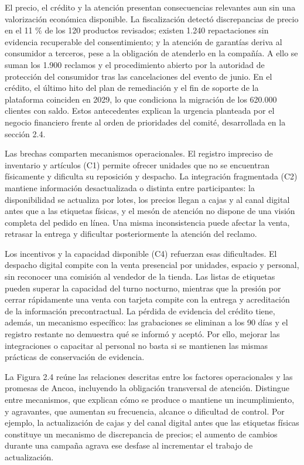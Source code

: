 \documentclass[11pt]{article}
\begin{document}
El precio, el crédito y la atención presentan consecuencias relevantes aun sin una valorización económica disponible. La fiscalización detectó discrepancias de precio en el 11 \% de los 120 productos revisados; existen 1.240 repactaciones sin evidencia recuperable del consentimiento; y la atención de garantías deriva al consumidor a terceros, pese a la obligación de atenderlo en la compañía. A ello se suman los 1.900 reclamos y el procedimiento abierto por la autoridad de protección del consumidor tras las cancelaciones del evento de junio. En el crédito, el último hito del plan de remediación y el fin de soporte de la plataforma coinciden en 2029, lo que condiciona la migración de los 620.000 clientes con saldo. Estos antecedentes explican la urgencia planteada por el negocio financiero frente al orden de prioridades del comité, desarrollada en la sección 2.4.

Las brechas comparten mecanismos operacionales. El registro impreciso de inventario y artículos (C1) permite ofrecer unidades que no se encuentran físicamente y dificulta su reposición y despacho. La integración fragmentada (C2) mantiene información desactualizada o distinta entre participantes: la disponibilidad se actualiza por lotes, los precios llegan a cajas y al canal digital antes que a las etiquetas físicas, y el mesón de atención no dispone de una visión completa del pedido en línea. Una misma inconsistencia puede afectar la venta, retrasar la entrega y dificultar posteriormente la atención del reclamo.

Los incentivos y la capacidad disponible (C4) refuerzan esas dificultades. El despacho digital compite con la venta presencial por unidades, espacio y personal, sin reconocer una comisión al vendedor de la tienda. Las listas de etiquetas pueden superar la capacidad del turno nocturno, mientras que la presión por cerrar rápidamente una venta con tarjeta compite con la entrega y acreditación de la información precontractual. La pérdida de evidencia del crédito tiene, además, un mecanismo específico: las grabaciones se eliminan a los 90 días y el registro restante no demuestra qué se informó y aceptó. Por ello, mejorar las integraciones o capacitar al personal no basta si se mantienen las mismas prácticas de conservación de evidencia.

La Figura 2.4 reúne las relaciones descritas entre los factores operacionales y las promesas de Ancoa, incluyendo la obligación transversal de atención. Distingue entre mecanismos, que explican cómo se produce o mantiene un incumplimiento, y agravantes, que aumentan su frecuencia, alcance o dificultad de control. Por ejemplo, la actualización de cajas y del canal digital antes que las etiquetas físicas constituye un mecanismo de discrepancia de precios; el aumento de cambios durante una campaña agrava ese desfase al incrementar el trabajo de actualización.
\end{document}
